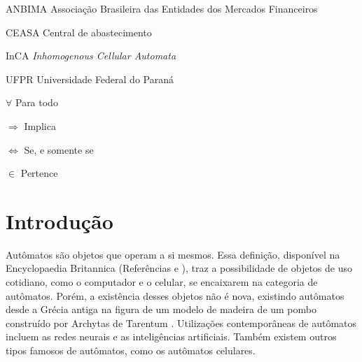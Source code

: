 \documentclass[
	12pt,				%
	openright,			%
	twoside,			%
	a4paper,			%
	english,			%
	french,				%
	spanish,			%
	brazil				%
	]{abntex2}
\begin{document}
\begin{siglas}
  \item[ANBIMA] Associação Brasileira das Entidades dos Mercados Financeiros
  \item[CEASA]  Central de abastecimento
  \item[InCA] \textit{Inhomogenous Cellular Automata}
  \item[UFPR] Universidade Federal do Paraná
\end{siglas}

\begin{simbolos}
  \item[$ \forall $] Para todo
  \item[$ \Rightarrow $] Implica
  \item[$ \Leftrightarrow $] Se, e somente se
  \item[$ \in $] Pertence
\end{simbolos}

\tableofcontents*
\cleardoublepage



\textual

\chapter{Introdução}

Autômatos são objetos que operam a si mesmos. Essa definição, disponível na Encyclopaedia Britannica (Referências \cite{britannica1} e \cite{britannica2}), traz a possibilidade de objetos de uso cotidiano, como o computador e o celular, se encaixarem na categoria de autômatos. Porém, a existência desses objetos não é nova, existindo autômatos desde a Grécia antiga na figura de um modelo de madeira de um pombo construído por Archytas de Tarentum \cite{britannica1}. Utilizações contemporâneas de autômatos incluem as redes neurais e as inteligências artificiais. Também existem outros tipos famosos de autômatos, como os autômatos celulares.
\end{document}
